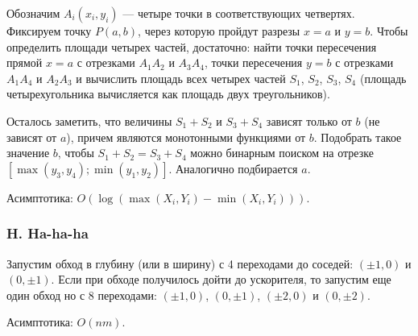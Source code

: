 
\begin{center}
\end{center}

Обозначим $A_i(x_i, y_i)$ --- четыре точки в соответствующих четвертях. Фиксируем точку $P(a, b)$, через которую пройдут разрезы $x = a$ и $y = b$. Чтобы определить площади четырех частей, достаточно: найти точки пересечения прямой $x = a$ с отрезками $A_1A_2$ и $A_3A_4$, точки пересечения $y = b$ с отрезками $A_1A_4$ и $A_2A_3$ и вычислить площадь всех четырех частей $S_1$, $S_2$, $S_3$, $S_4$ (площадь четырехугольника вычисляется как площадь двух треугольников). 

Осталось заметить, что величины $S_1 + S_2$ и $S_3 + S_4$ зависят только от $b$ (не зависят от $a$), причем являются монотонными функциями от $b$. Подобрать такое значение $b$, чтобы $S_1 + S_2 = S_3 + S_4$ можно бинарным поиском на отрезке $[\max(y_3, y_4); \min(y_1, y_2)]$. Аналогично подбирается $a$.

Асимптотика: $O(\log(\max(X_i, Y_i) - \min(X_i, Y_i)))$.



\subsubsection*{H. Ha-ha-ha} 


Запустим обход в глубину (или в ширину) с 4 переходами до соседей: $(\pm 1, 0)$ и $(0, \pm 1)$. Если при обходе получилось дойти до ускорителя, то запустим еще один обход но с 8 переходами: $(\pm 1, 0)$, $(0, \pm 1)$, $(\pm 2, 0)$ и $(0, \pm 2)$.

Асимптотика: $O(n m)$.